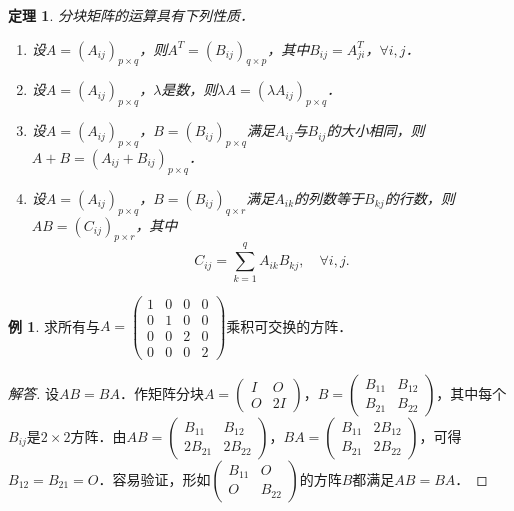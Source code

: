 \documentclass[a4paper,fontset=windows]{ctexbook}
\newtheorem{theorem}{定理}[chapter]
\theoremstyle{definition}
\newtheorem{example}{例}[chapter]
\begin{document}
\begin{theorem}\label{thm2.3}
分块矩阵的运算具有下列性质．
\begin{enumerate}
\item 设$A=(A_{ij})_{p\times q}$，则$A^T=(B_{ij})_{q\times p}$，其中$B_{ij}=A_{ji}^T$，$\forall i,j$．

\item 设$A=(A_{ij})_{p\times q}$，$\lambda$是数，则$\lambda A=(\lambda A_{ij})_{p\times q}$．

\item 设$A=(A_{ij})_{p\times q}$，$B=(B_{ij})_{p\times q}$满足$A_{ij}$与$B_{ij}$的大小相同，则$A+B=(A_{ij}+B_{ij})_{p\times q}$．

\item 设$A=(A_{ij})_{p\times q}$，$B=(B_{ij})_{q\times r}$满足$A_{ik}$的列数等于$B_{kj}$的行数，则$AB=(C_{ij})_{p\times r}$，其中
$$C_{ij}=\sum_{k=1}^qA_{ik}B_{kj},\quad\forall i,j.$$
\end{enumerate}
\end{theorem}

\begin{example}\label{ex2.11}
求所有与$A=\begin{pmatrix}1&0&0&0 \\ 0&1&0&0 \\ 0&0&2&0 \\ 0&0&0&2\end{pmatrix}$乘积可交换的方阵．
\end{example}

\begin{proof}[解答]
设$AB=BA$．作矩阵分块$A=\begin{pmatrix}I&O \\ O&2I\end{pmatrix}$，$B=\begin{pmatrix}B_{11}&B_{12} \\ B_{21}&B_{22}\end{pmatrix}$，其中每个$B_{ij}$是$2\times 2$方阵．由$AB=\begin{pmatrix}B_{11}&B_{12} \\ 2B_{21}&2B_{22}\end{pmatrix}$，$BA=\begin{pmatrix}B_{11}&2B_{12} \\ B_{21}&2B_{22}\end{pmatrix}$，可得$B_{12}=B_{21}=O$．容易验证，形如$\begin{pmatrix}B_{11}&O \\ O&B_{22}\end{pmatrix}$的方阵$B$都满足$AB=BA$．
\end{proof}
\end{document}
